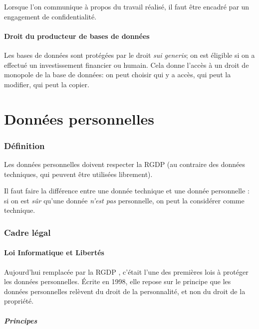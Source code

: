 \documentclass[10pt,a4paper,french]{article}
\begin{document}
Lorsque l'on communique à propos du travail réalisé, il faut être encadré par un engagement de confidentialité.

\subsection{Droit du producteur de bases de données}

Les bases de données sont protégées par le droit \textit{sui generis}; on est éligible si on a effectué un investissement financier ou humain. Cela donne l'accès à un droit de monopole de la base de données: on peut choisir qui y a accès, qui peut la modifier, qui peut la copier.

\part{Données personnelles}

\section{Définition}

Les données personnelles doivent respecter la RGDP (au contraire des données techniques, qui peuvent être utilisées librement).

Il faut faire la différence entre une donnée technique et une donnée personnelle : si on est \textit{sûr} qu'une donnée \textit{n'est pas} personnelle, on peut la considérer comme technique.

\section{Cadre légal}

\subsection{Loi Informatique et Libertés}\label{sec:loi-info-liberte}
Aujourd'hui remplacée par la RGDP , c'était l'une des premières lois à protéger les données personnelles. Écrite en 1998, elle repose sur le principe que les données personnelles relèvent du droit de la personnalité, et non du droit de la propriété.

\subsubsection{Principes}
\end{document}
